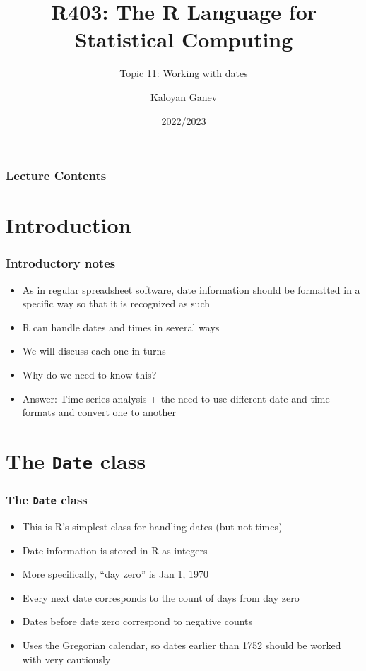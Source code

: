 \documentclass[10pt]{beamer}
\title{R403: The R Language for Statistical Computing}
\subtitle{Topic 11: \textcolor{myred}{Working with dates}}
\author{Kaloyan Ganev}
\date{2022/2023}
\theoremstyle{definition}
\begin{document}
\maketitle

\begin{frame}[fragile]
\frametitle{Lecture Contents}
\tableofcontents
\end{frame}

\section{Introduction}
\begin{frame}[fragile]
\frametitle{Introductory notes}
\begin{itemize}
	\item As in regular spreadsheet software, date information should be formatted in a specific way so that it is recognized as such
	\item R can handle dates and times in several ways
	\item We will discuss each one in turns
	\item Why do we need to know this?
	\item Answer: Time series analysis + the need to use different date and time formats and convert one to another
\end{itemize}
\end{frame}

\section{The \texttt{Date} class}
\begin{frame}[fragile]
\frametitle{The \texttt{Date} class}
\begin{itemize}
	\item This is R's simplest class for handling dates (but not times)
	\item Date information is stored in R as integers
	\item More specifically, ``day zero'' is Jan 1, 1970
	\item Every next date corresponds to the count of days from day zero
	\item Dates before date zero correspond to negative counts
	\item Uses the Gregorian calendar, so dates earlier than 1752 should be worked with very cautiously
\end{itemize}
\end{frame}
\end{document}
